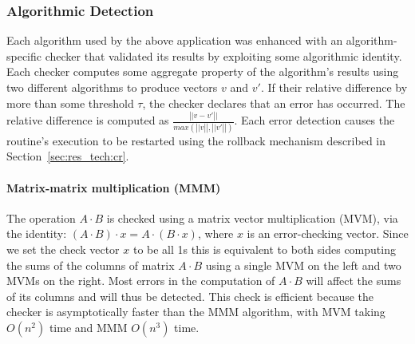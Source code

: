 \documentclass{sig-alternate}
\newcommand{\sui}[1]{%
  \textcolor{green}{SC - #1}
}
\begin{document}
\vspace{-5pt}
\subsubsection{Algorithmic Detection}
\label{sec:res_tech:err_det:algo}


Each algorithm used by the above application was enhanced with an algorithm-specific checker that validated its results by exploiting some algorithmic identity.
Each checker computes some aggregate property of the algorithm's results using two different algorithms to produce vectors $v$ and $v'$.
If their relative difference by more than some threshold $\tau$, the checker declares that an error has occurred.
The relative difference is computed as $\frac{\left|| v-v' \right||}{max(\left||v\right||, \left||v'\right||)}$.
Each error detection causes the routine's execution to be restarted using the rollback mechanism described in Section~\ref{sec:res_tech:cr}.

\vspace{-5pt}
\paragraph{Matrix-matrix multiplication (MMM)}
The operation $A \cdot B$ is checked using a matrix vector multiplication (MVM), via the identity: $(A \cdot B) \cdot x = A \cdot (B \cdot x)$, where $x$ is an error-checking vector.
Since we set the check vector $x$ to be all 1s this is equivalent to both sides computing the sums of the columns of matrix $A \cdot B$ using a single MVM on the left and two MVMs on the right.
Most errors in the computation of $A \cdot B$ will affect the sums of its columns and will thus be detected.
This check is efficient because the checker is asymptotically faster than the MMM algorithm, with MVM taking $O(n^2)$ time and MMM $O(n^3)$ time.

\vspace{-5pt}
\end{document}
